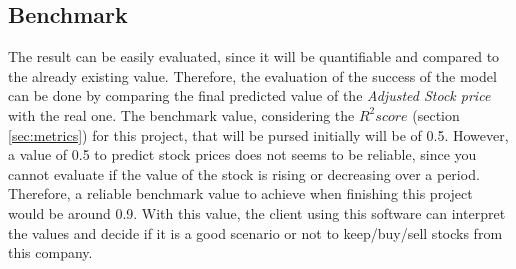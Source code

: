 \subsection{Benchmark}
\label{subsec:bench}
The result can be easily evaluated, since it will be quantifiable and compared to the already existing value. Therefore, the evaluation of the success of the model can be done by comparing the final
predicted value of the \emph{Adjusted Stock price} with the real one. The benchmark value, considering the $R^2 score$ (section \ref{sec:metrics}) for this project, that will be pursed initially will be of 0.5.
However, a value of 0.5 to predict stock prices does not seems to be reliable, since you cannot evaluate if the value of the stock is rising or decreasing over a period. 
Therefore, a reliable benchmark value to achieve when finishing this project would be around 0.9. With this value, the client using this software can interpret the values and decide if it is
a good scenario or not to keep/buy/sell stocks from this company.
\\